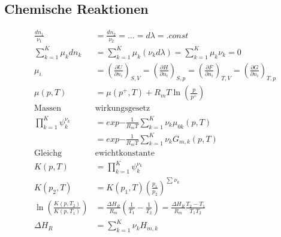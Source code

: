 \documentclass[twocolumn]{article}
\begin{document}
\begin{multicols}{2}
	\section{Chemische Reaktionen}

	\begin{align*}
		\frac{dn_1}{\nu_1} &= \frac{dn_2}{\nu_2} = \ldots = d\lambda = .const \\
		\sum_{k=1}^K \mu_k dn_k &= \sum_{k=1}^{K} \mu_k(\nu_kd\lambda) = \sum_{k=1}^{K} \mu_k \nu_k = 0 \\
		\mu_i &= \left(\frac{\partial U}{\partial n_i}\right)_{S,V}  = \left(\frac{\partial H}{\partial n_i}\right)_{S,p} = \left(\frac{\partial F}{\partial n_i}\right)_{T,V} = \left(\frac{\partial G}{\partial n_i}\right)_{T,p} \\
		\mu (p,T) &= \mu (p^+, T) + R_mT\ln \left( \frac{p}{p^+}\right) \\
		\text{Massen}&\text{wirkungsgesetz} \\
		\prod_{k=1}^K \psi_k^{\nu_k} &= exp{- \frac{1}{R_mT} \sum_{k=1}^{K} \nu_k \mu_{0k}(p,T)} \\
		&= exp{- \frac{1}{R_mT} \sum_{k=1}^{K} \nu_k G_{m,k}(p,T)} \\
		\text{Gleichg}&\text{ewichtkonstante} \\
		K(p,T) &= \prod_{k=1}^K \psi_k^{\nu_k} \\
		K(p_2,T) &= K(p_1,T) \left(\frac{p_1}{p_2}\right)^{\sum_{}^{} \nu_k} \\
		\ln \left(\frac{K(p,T_2)}{K(p,T_1)}\right) &= \frac{\Delta H_R}{R_m}\left(\frac{1}{T_1} - \frac{1}{T_2}\right) = \frac{\Delta H_R}{R_m} \frac{T_2-T_1}{T_1T_2} \\
		\Delta H_R &= \sum_{k=1}^{K} \nu_k H_{m,k} \\
	\end{align*}

\end{multicols}
\end{document}
